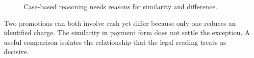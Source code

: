 \begin{figure}[H]
\centering
{}
\caption{Case-based reasoning needs reasons for similarity and difference.}\label{fig:teach-M05-02}
\end{figure}

Two promotions can both involve cash yet differ because only one reduces an identified charge. The similarity in payment form does not settle the exception. A useful comparison isolates the relationship that the legal reading treats as decisive.

